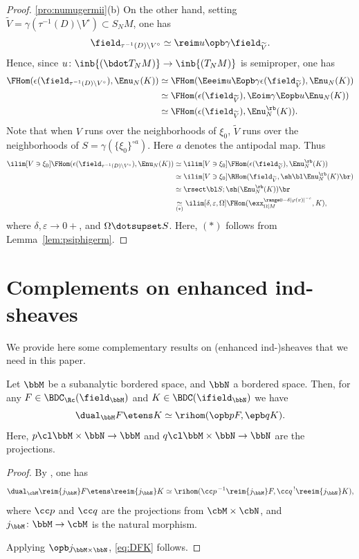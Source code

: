 \begin{proof}
\eqref{pro:numugermii}(b)
On the other hand,
setting $\widetilde V = \gamma(\tau^{-1}(D)\setminus V^\circ)\subset S_NM$, one has
\[
\field_{\tau^{-1}(D)\setminus V^\circ} \simeq \reim u\opb\gamma\field_{\widetilde V}.
\]
Hence, since $u\colon\inb{(\bdot T_NM)}\to\inb{(T_NM)}$ is semiproper, one has
\begin{align*}
\FHom(\epsilon(\field_{\tau^{-1}(D)\setminus V^\circ}),\Enu_N(K))
&\simeq \FHom(\Eeeim u\Eopb\gamma \epsilon(\field_{\widetilde V}),\Enu_N(K)) \\
&\simeq \FHom(\epsilon(\field_{\widetilde V}),\Eoim\gamma\Eopb u\Enu_N(K)) \\
&\simeq \FHom(\epsilon(\field_{\widetilde V}),\Enu^\rb_N(K)).
\end{align*}
Note that when $V$ runs over the neighborhoods of $\xi_0$, $\widetilde V$ runs over the neighborhoods of $S=\gamma(\{\xi_0\}^{\circ a})$. Here $a$ denotes the antipodal map. Thus
\begin{align*}
\ilim[V\owns\xi_0] \FHom(\epsilon(\field_{\tau^{-1}(D)\setminus V^\circ}),\Enu_N(K))
&\simeq \ilim[V\owns\xi_0] \FHom(\epsilon(\field_{\widetilde V}),\Enu^\rb_N(K)) \\
&\simeq \ilim[V\owns\xi_0] \RHom(\field_{\widetilde V},\sh\bl\Enu^\rb_N(K)\br) \\
&\simeq \rsect\bl S;\sh(\Enu^\rb_N(K))\br \\
&\underset{(*)}\simeq \ilim[\delta,\varepsilon,\Omega]
\FHom( \exx^{\range0{-\delta|\varphi(x)|^{-\varepsilon}}}_{\Omega|M} , K),
\end{align*}
where $\delta,\varepsilon\to0+$, and $\Omega\dotsupset S$.
Here, $(*)$ follows from Lemma~\ref{lem:psiphigerm}.
\end{proof}

\appendix

\section{Complements on enhanced ind-sheaves}\label{se:compl}

We provide here some complementary results on (enhanced ind-)sheaves that we need in this paper.

\begin{proposition}
Let $\bbM$ be a subanalytic bordered space, and $\bbN$ a bordered space.
Then, for any $F\in\BDC_{\Rc}(\field_\bbM)$ and $K\in\BDC(\ifield_\bbN)$
we have
\begin{equation} \label{eq:DFK}
\dual_\bbM F\etens K\simeq \rihom
(\opb p F,\epb q K).
\end{equation}
Here, $p\cl \bbM\times\bbN\to\bbM$ and $q\cl\bbM\times\bbN\to\bbN$
are the projections.
\end{proposition}
\begin{proof}
By \cite[Prop.\,2.3.4]{DK16}, one has
\[
\dual_\cbM\reim{{j_\bbM}} F\etens \reeim{{j_\bbN}} K\simeq \rihom
(\cc p{}^{\,-1}\reim{{j_\bbM}} F,\cc q{}^{\,!}\reeim{{j_\bbN}} K),
\]
where $\cc p$ and $\cc q$ are the projections from $\cbM\times\cbN$, and $j_\bbM\colon\bbM\to\cbM$ is the natural morphism.

Applying $\opb j_{\bbM\times\bbN}$, \eqref{eq:DFK} follows.
\end{proof}

